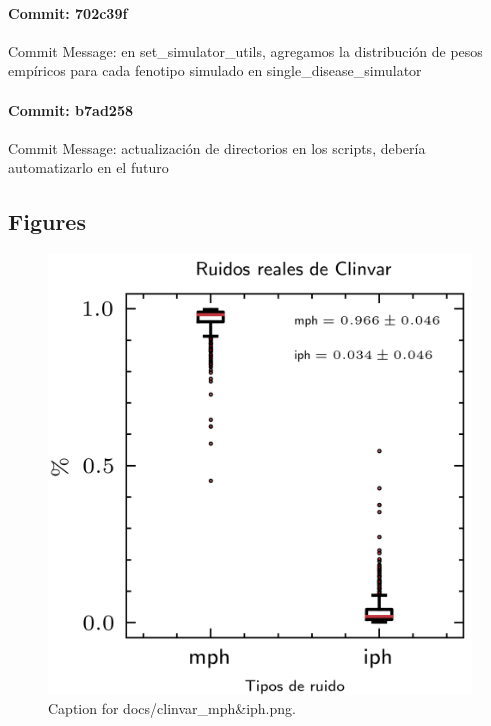 \documentclass{article}
\begin{document}
\paragraph{Commit: 702c39f}
Commit Message: en set_simulator_utils, agregamos la distribución de pesos empíricos para cada fenotipo simulado en single_disease_simulator

\paragraph{Commit: b7ad258}
Commit Message: actualización de directorios en los scripts, debería automatizarlo en el futuro

\subsection{Figures}
\begin{figure}[h] \centering \includegraphics{docs/clinvar_mph&iph.png} \caption{Caption for docs/clinvar_mph&iph.png.} \end{figure}
\end{document}
